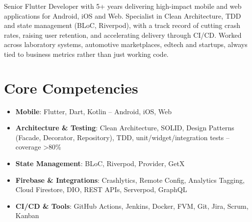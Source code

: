 \documentclass[11pt,a4paper,sans]{moderncv}
\begin{document}
\makecvtitle


\vspace{6pt}
\small{Senior Flutter Developer with 5+ years delivering high-impact mobile and web applications for Android, iOS and Web. Specialist in Clean Architecture, TDD and state management (BLoC, Riverpod), with a track record of cutting crash rates, raising user retention, and accelerating delivery through CI/CD. Worked across laboratory systems, automotive marketplaces, edtech and startups, always tied to business metrics rather than just working code.}


\section{Core Competencies}
\vspace{1pt}
\begin{itemize}

\item \textbf{Mobile}: Flutter, Dart, Kotlin -- Android, iOS, Web

\item \textbf{Architecture \& Testing}: Clean Architecture, SOLID, Design Patterns (Facade, Decorator, Repository), TDD, unit/widget/integration tests -- coverage \textgreater{}80\%

\item \textbf{State Management}: BLoC, Riverpod, Provider, GetX

\item \textbf{Firebase \& Integrations}: Crashlytics, Remote Config, Analytics Tagging, Cloud Firestore, DIO, REST APIs, Serverpod, GraphQL

\item \textbf{CI/CD \& Tools}: GitHub Actions, Jenkins, Docker, FVM, Git, Jira, Scrum, Kanban

\end{itemize}

\end{document}
